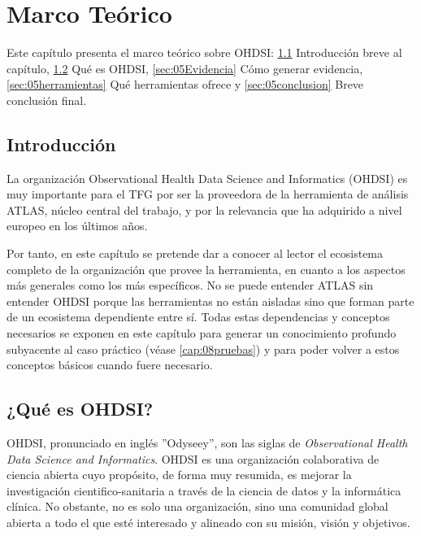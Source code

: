 \chapter{Marco Teórico}\label{cap:05EstudioPrevio}

Este capítulo presenta el marco teórico sobre OHDSI:  \ref{sec:05intro} Introducción breve al capítulo,  \ref{sec:05OHDSI} Qué es OHDSI,  \ref{sec:05Evidencia} Cómo generar evidencia, \ref{sec:05herramientas} Qué herramientas ofrece y \ref{sec:05conclusion} Breve conclusión final.

\section{Introducción} \label{sec:05intro}

La organización Observational Health Data Science and Informatics (OHDSI) es muy importante para el TFG por ser la proveedora de la herramienta de análisis ATLAS, núcleo central del trabajo, y por la relevancia que ha adquirido a nivel europeo en los últimos años.

Por tanto, en este capítulo se pretende dar a conocer al lector el ecosistema completo de la organización que provee la herramienta, en cuanto a los aspectos más generales como los más específicos. No se puede entender ATLAS sin entender OHDSI porque las herramientas no están aisladas sino que forman parte de un ecosistema dependiente entre sí. Todas estas dependencias y conceptos necesarios se exponen en este capítulo para generar un conocimiento profundo subyacente al caso práctico (véase \ref{cap:08pruebas}) y para poder volver a estos conceptos básicos cuando fuere necesario.

\section{¿Qué es OHDSI?} \label{sec:05OHDSI}

OHDSI, pronunciado en inglés ''Odyseey'', son las siglas de \textit{Observational Health Data Science and Informatics}. OHDSI es una organización colaborativa de ciencia abierta cuyo propósito, de forma muy resumida, es mejorar la investigación cientifico-sanitaria a través de la ciencia de datos y la informática clínica. No obstante, no es solo una organización, sino una comunidad global abierta a todo el que esté interesado y alineado con su misión, visión y objetivos. 

